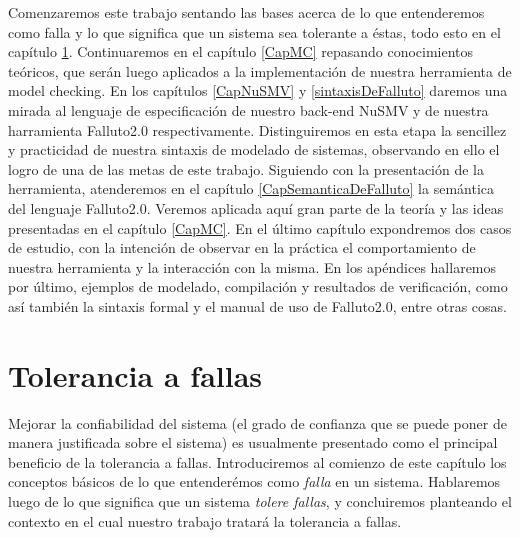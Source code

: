 \documentclass[pdftex,a4paper,12pt]{book}
\begin{document}
Comenzaremos este trabajo sentando las bases acerca de lo que entenderemos como falla y lo que significa que un sistema sea tolerante a \'estas, todo esto en el cap\'itulo \ref{CapToleranciaAFallas}. Continuaremos en el cap\'itulo \ref{CapMC} repasando conocimientos te\'oricos, que ser\'an luego aplicados a la implementaci\'on de nuestra herramienta de model checking. En los cap\'itulos \ref{CapNuSMV} y \ref{sintaxisDeFalluto} daremos una mirada al lenguaje de especificaci\'on de nuestro back-end NuSMV y de nuestra harramienta Falluto2.0 respectivamente. Distinguiremos en esta etapa la sencillez y practicidad de nuestra sintaxis de modelado de sistemas, observando en ello el logro de una de las metas de este trabajo. Siguiendo con la presentaci\'on de la herramienta, atenderemos en el cap\'itulo \ref{CapSemanticaDeFalluto} la sem\'antica del lenguaje Falluto2.0. Veremos aplicada aqu\'i gran parte de la teor\'ia y las ideas presentadas en el cap\'itulo \ref{CapMC}. En el \'ultimo cap\'itulo expondremos dos casos de estudio, con la intenci\'on de observar en la pr\'actica el comportamiento de nuestra herramienta y la interacci\'on con la misma. En los ap\'endices hallaremos por \'ultimo, ejemplos de modelado, compilaci\'on y resultados de verificaci\'on, como as\'i tambi\'en la sintaxis formal y el manual de uso de Falluto2.0, entre otras cosas.









\chapter{Tolerancia a fallas}
\label{CapToleranciaAFallas}
Mejorar la confiabilidad del sistema (el grado de confianza que se puede poner 
de manera justificada sobre el sistema) es usualmente presentado como el 
principal beneficio de la tolerancia a fallas. Introduciremos al comienzo de este cap\'itulo los conceptos b\'asicos de lo que entender\'emos como \textit{falla} en un sistema. Hablaremos luego de lo que significa que un sistema \textit{tolere fallas}, y concluiremos planteando el contexto en el cual nuestro trabajo tratar\'a la tolerancia a fallas.



\end{document}
